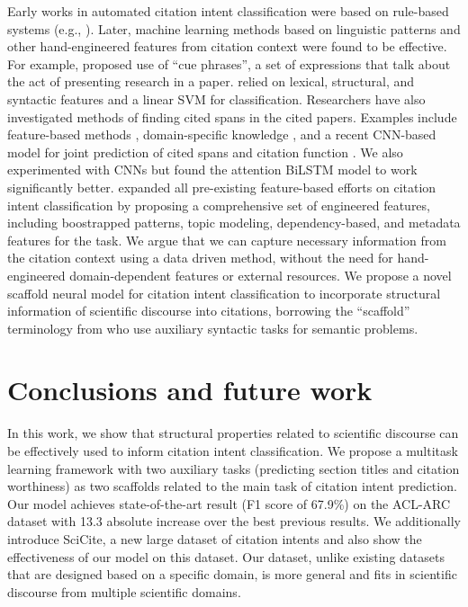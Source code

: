 \documentclass[11pt,a4paper]{article}
\newcommand{\acldata}{ACL-ARC\xspace}
\newcommand{\ourdata}{SciCite\xspace}
\begin{document}
Early works in automated citation intent classification were based on rule-based systems (e.g., \cite{garzone2000towards,pham2003new}). Later, machine learning methods based on linguistic patterns and other hand-engineered features from citation context were found to be effective. For example, \citet{teufel2006function} proposed use of ``cue phrases'', a set of expressions
that talk about the act of presenting research
in a paper. \citet{abu2013purpose} relied on lexical, structural, and syntactic features and a linear SVM for classification. Researchers have also investigated methods of finding cited spans in the cited papers. Examples include feature-based methods \cite{Cohan2015MatchingCT}, domain-specific knowledge \cite{Cohan2017ContextualizingCF}, and a recent CNN-based model for joint prediction of cited spans and citation function \cite{Su2018NeuralML}. We also experimented with CNNs but found the attention BiLSTM model to work significantly better.
\citet{jurgens2018} expanded all pre-existing feature-based efforts on citation intent classification by proposing a comprehensive set of engineered features, including boostrapped patterns, topic modeling, dependency-based, and metadata features for the task. We argue that we can capture necessary information from the citation context using a data driven method, without the need for hand-engineered domain-dependent features or external resources. We propose a novel scaffold neural model for citation intent classification to incorporate structural information of scientific discourse into citations, borrowing the ``scaffold'' terminology from \citet{Swayamdipta2018SyntacticSF} who use auxiliary syntactic tasks for semantic problems.

\section{Conclusions and future work}
\label{sec:conclusion}

In this work, we show that structural properties related to scientific discourse can be effectively used to inform citation intent classification. We propose a multitask learning framework with two auxiliary tasks (predicting section titles and citation worthiness) as two scaffolds related to the main task of citation intent prediction. Our model achieves state-of-the-art result (F1 score of 67.9\%) on the \acldata dataset with 13.3 absolute increase over the best previous results. We additionally introduce \ourdata, a new large dataset of citation intents and also show the effectiveness of our model on this dataset. Our dataset, unlike existing datasets that are designed based on a specific domain, is more general and fits in scientific discourse from multiple scientific domains.
\end{document}

